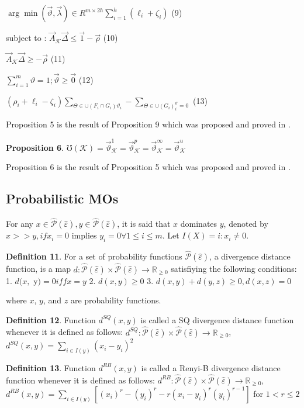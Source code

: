 \documentclass[]{iosart2c}
\begin{document}
  $\arg \min(\vec{\vartheta},\vec{\lambda})\in R^{m \times 2h}\sum^h_{i=1}(\ell_i + \zeta_i)$ (9)

  subject to : $\vec{A}_\mathcal{K} \vec{\Delta} \le \vec{1} - \vec{\rho}$ (10)

  $\vec{A}_\mathcal{K} \vec\Delta\geq -\vec{\rho}$ (11)

  $\sum^m_{i=1} \vartheta = 1;\vec{\vartheta}\geq\vec{0}$ (12)

  $(\rho_i + \ell_i - \zeta_i)\sum_{\Theta \in \cup(F_i \cap G_i)\vartheta_i} - \sum_{\Theta\in\cup(G_i)^\vartheta_i=0}$ (13)

  Proposition 5 is the result of Proposition 9 which was proposed and proved in \cite{10}.

  \textbf{Proposition 6}. $\mho(\mathcal{K}) = \vec{\vartheta}^1_\mathcal{K} = \vec{\vartheta}^p_\mathcal{K} = \vec{\vartheta}^\infty_\mathcal{K} = \vec{\vartheta}^u_\mathcal{K}$

  Proposition 6 is the result of Proposition 5 which was proposed and proved in \cite{24}.

  \subsection{Probabilistic MOs}

  For any $x \in \hat{\mathcal{P}}(\hat{\varepsilon}), y \in \hat{\mathcal{P}}(\hat{\varepsilon})$, it is said that $x$ dominates $y$, denoted by $x >> y, if x_i = 0$ implies $y_i = 0 \forall 1 \le i \le m$. Let $I(X) = {i : x_i \neq 0}$.

  \textbf{Definition 11}. For a set of probability functions $\hat{\mathcal{P}} (\hat{\varepsilon})$, a divergence distance function, is a map $d : \hat{\mathcal{P}} (\hat{\varepsilon}) \times \hat{\mathcal{P}} (\hat{\varepsilon}) \to \mathbb{R}_{\geq0}$ satisfiying the following conditions:
  1. $d(x,$ y$) = 0 iff x = y$
  2. $d(x, y) \geq 0$
  3. $d(x, y) + d(y, z)\ge0, d(x, z) = 0$

  where $x$, $y$, and $z$ are probability functions.

  \textbf{Definition 12}. Function $d^{SQ}(x, y)$ is called a SQ divergence distance function whenever it is defined as follows: $d^{SQ} : \hat{\mathcal{P}} (\hat{\varepsilon}) \times \hat{\mathcal{P}} (\hat{\varepsilon}) \to \mathbb{R}_{\geq0}$, $d^{SQ}(x, y) = \sum_{i \in I(y)} (x_i - y_i)^2$

  \textbf{Definition 13}. Function $d^{RB}(x, y)$ is called a Renyi-B divergence distance function whenever it is defined as follows: $d^{RB} : \hat{\mathcal{P}}(\hat{\varepsilon}) \times \hat{\mathcal{P}} (\hat{\varepsilon}) \to \mathbb{R}_{\ge 0}$, $d^{RB}(x, y)=\sum_{i\in I(y)}[(x_i)^r - (y_i)^r - r(x_i - y_i)^r(y_i)^{r-1}]$ for $1 < r \le 2$
\end{document}
